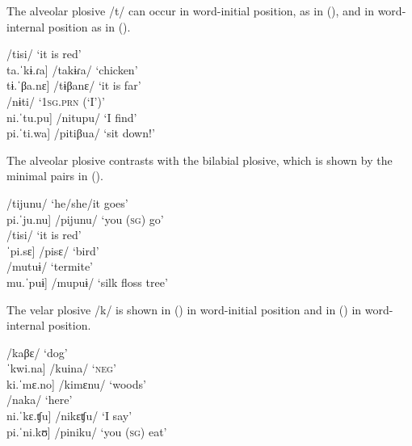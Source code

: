 The alveolar plosive /t/ can occur in word-initial position, as in (), and in word-internal position as in ().

\ea\label{ex:t}
\ea\label{ex:t.1}   \tab [ˈti.si] \tab\tab  /tisi/ \tab\tab  ‘it is red’\\
     \tab{[}ta.ˈkɨ.ɾa] \tab /takɨɾa/ \tab ‘chicken’\\
     \tab{[}tɨ.ˈβa.nɛ] \tab /tɨβanɛ/ \tab ‘it is far’\\
\ex\label{ex:t.2}  \tab [ˈnɨ.ti] \tab  /nɨti/ \tab\tab  ‘1\textsc{sg.prn} (‘I’)’\\
     \tab{[}ni.ˈtu.pu] \tab /nitupu/ \tab ‘I find’\\
     \tab{[}pi.ˈti.wa] \tab /pitiβua/ \tab ‘sit down!’\\%
\z
\xe
    
The alveolar plosive contrasts with the bilabial plosive, which is shown by the minimal pairs in ().

\ea\label{ex:t-p}
\ea\label{ex:t-p.1} \tab  [ti.ˈju.nu] \tab /tijunu/ \tab ‘he/she/it goes’\\
   \tab {[}pi.ˈju.nu] \tab /pijunu/ \tab ‘you (\textsc{sg}) go’\\
\ex\label{ex:t-p.2}  \tab [ˈti.si] \tab\tab /tisi/ \tab\tab ‘it is red’ \\
     \tab {[}ˈpi.sɛ] \tab /pisɛ/ \tab\tab ‘bird’\\
\ex\label{ex:t-p.3}  \tab [mu.ˈtu.ɨ] \tab /mutuɨ/ \tab ‘termite’ \\
      \tab{[}mu.ˈpuɨ] \tab /mupuɨ/ \tab ‘silk floss tree’\\%
\z
\xe    



The velar plosive /k/ is shown in () in word-initial position and in () in word-internal position.

\ea\label{ex:k}
\ea\label{ex:k.1} \tab[ˈka.və] \tab  /kaβɛ/ \tab  ‘dog’\\
     \tab{[}ˈkwi.na] \tab /kuina/ \tab ‘\textsc{neg}’\\
     \tab{[}ki.ˈmɛ.no] \tab /kimɛnu/ \tab ‘woods’\\
\ex\label{ex:k.2}   \tab[ˈna.ka] \tab  /naka/ \tab  ‘here’\\
     \tab{[}ni.ˈkɛ.ʧu] \tab /nikɛʧu/ \tab ‘I say’\\
     \tab{[}pi.ˈni.kʊ] \tab /piniku/ \tab ‘you (\textsc{sg}) eat’\\%
\z
\xe
    
